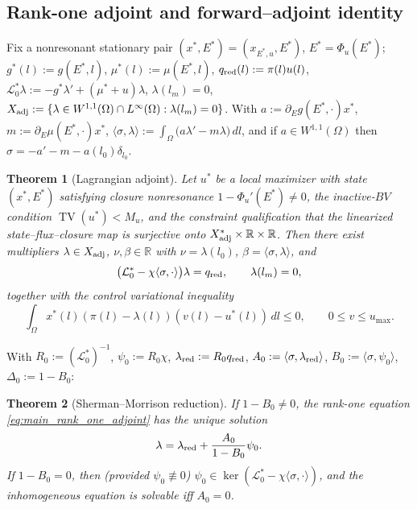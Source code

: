 \documentclass[a4paper,fleqn,longmktitle]{cas-sc}
\theoremstyle{plain}
\newtheorem{theorem}{Theorem}[section]
\theoremstyle{definition}
\theoremstyle{remark}
\numberwithin{equation}{section}
\begin{document}
\subsection{Rank-one adjoint and forward--adjoint identity}
\label{subsec:main_adjoint}
Fix a nonresonant stationary pair \((x^*,E^*)=(x_{E^*,u},E^*)\),
\(E^*=\Phi_u(E^*)\); \(g^*(l):=g(E^*,l)\), \(\mu^*(l):=\mu(E^*,l)\),
\(q_{\rm red}(l):=\pi(l)u(l)\),
\(\mathcal L_0^*\lambda:=-g^*\lambda'+(\mu^*+u)\lambda\), \(\lambda(l_m)=0\),
\(X_{\rm adj}:=\{\lambda\in W^{1,1}(\Omega)\cap L^\infty(\Omega):\lambda(l_m)=0\}\).
With \(a:=\partial_Eg(E^*,\cdot)x^*\), \(m:=\partial_E\mu(E^*,\cdot)x^*\),
$\displaystyle    \langle\sigma,\lambda\rangle
    :=
    \int_\Omega\big(a\lambda'-m\lambda\big)\,dl$,
and if \(a\in W^{1,1}(\Omega)\) then \(\sigma=-a'-m-a(l_0)\delta_{l_0}\).
\begin{theorem}[Lagrangian adjoint]
\label{thm:main_lagrangian_adjoint}
Let \(u^*\) be a local maximizer with state \((x^*,E^*)\) satisfying closure
nonresonance \(1-\Phi_u'(E^*)\ne0\), the inactive-\(BV\) condition
\(\operatorname{TV}(u^*)<M_u\), and the constraint qualification that the
linearized state--flux--closure map is surjective onto
\(X_{\rm adj}^*\times\mathbb R\times\mathbb R\). Then there exist multipliers
\(\lambda\in X_{\rm adj}\), \(\nu,\beta\in\mathbb R\) with
\(\nu=\lambda(l_0)\), \(\beta=\langle\sigma,\lambda\rangle\), and
\begin{equation}
    \label{eq:main_rank_one_adjoint}
    \big(\mathcal L_0^*-\chi\langle\sigma,\cdot\rangle\big)\lambda
    =
    q_{\rm red},
    \qquad
    \lambda(l_m)=0 ,
\end{equation}
together with the control variational inequality
\begin{equation}
    \label{eq:main_control_VI}
    \int_\Omega x^*(l)(\pi(l)-\lambda(l))(v(l)-u^*(l))\,dl
    \le0,
    \qquad
    0\le v\le u_{\max}.
\end{equation}
\end{theorem}
With \(R_0:=(\mathcal L_0^*)^{-1}\), \(\psi_0:=R_0\chi\),
\(\lambda_{\rm red}:=R_0q_{\rm red}\),
\(A_0:=\langle\sigma,\lambda_{\rm red}\rangle\),
\(B_0:=\langle\sigma,\psi_0\rangle\), \(\Delta_0:=1-B_0\):
\begin{theorem}[Sherman--Morrison reduction]
\label{thm:main_sherman_morrison}
If \(1-B_0\ne0\), the rank-one equation \eqref{eq:main_rank_one_adjoint} has the
unique solution
\begin{equation}
    \label{eq:main_SM_solution}
    \lambda
    =
    \lambda_{\rm red}
    +
    \frac{A_0}{1-B_0}\psi_0.
\end{equation}
If \(1-B_0=0\), then (provided \(\psi_0\not\equiv0\))
\(\psi_0\in\ker(\mathcal L_0^*-\chi\langle\sigma,\cdot\rangle)\), and the
inhomogeneous equation is solvable iff \(A_0=0\).
\end{theorem}
\end{document}
